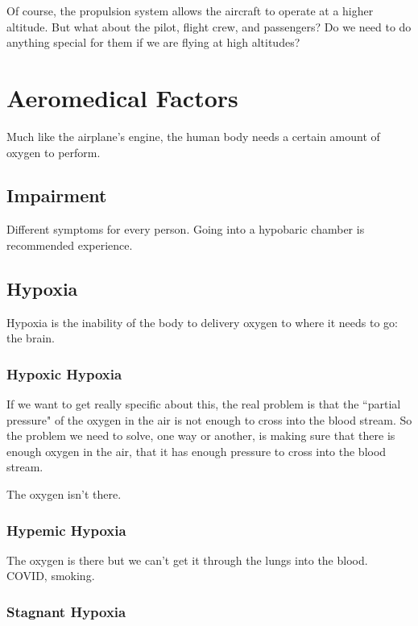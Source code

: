 Of course, the propulsion system allows the aircraft to operate at a higher altitude. But what about the pilot, flight crew, and passengers? Do we need to do anything special for them if we are flying at high altitudes?

\section{Aeromedical Factors}

Much like the airplane's engine, the human body needs a certain amount of oxygen to perform.

\subsection{Impairment}

Different symptoms for every person. Going into a hypobaric chamber is recommended experience.

\subsection{Hypoxia}

Hypoxia is the inability of the body to delivery oxygen to where it needs to go: the brain.

\subsubsection{Hypoxic Hypoxia}

If we want to get really specific about this, the real problem is that the ``partial pressure" of the oxygen in the air is not enough to cross into the blood stream. So the problem we need to solve, one way or another, is making sure that there is enough oxygen in the air, that it has enough pressure to cross into the blood stream.

The oxygen isn't there.

\subsubsection{Hypemic Hypoxia}

The oxygen is there but we can't get it through the lungs into the blood. COVID, smoking.

\subsubsection{Stagnant Hypoxia}

